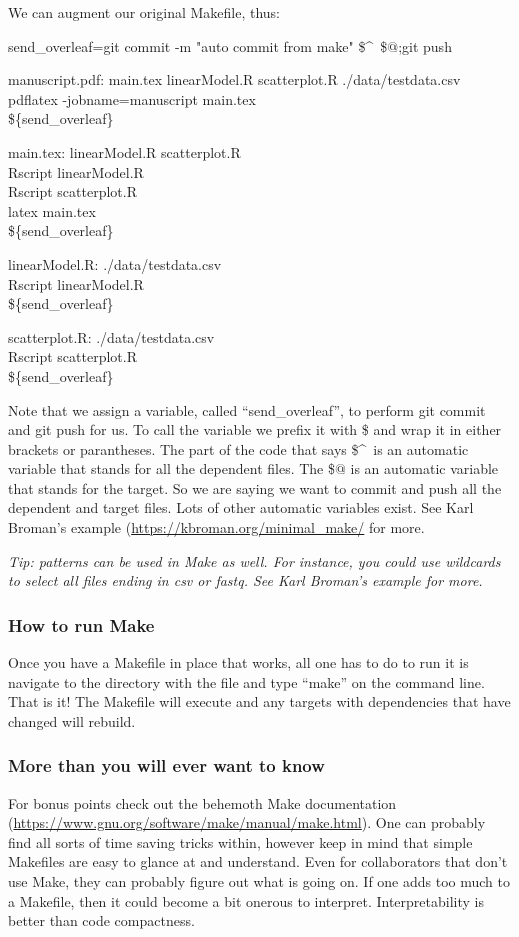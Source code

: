 \documentclass{article}
\begin{document}
We can augment our original Makefile, thus:

send\_overleaf=git commit -m "auto commit from make" \$\textasciicircum\ \$$@$;git push

manuscript.pdf: main.tex linearModel.R scatterplot.R ./data/testdata.csv\\
\tab pdflatex -jobname=manuscript main.tex\\
\tab \$\{send\_overleaf\}

main.tex: linearModel.R scatterplot.R\\
\tab Rscript linearModel.R\\
\tab Rscript scatterplot.R\\
\tab latex main.tex\\
\tab \$\{send\_overleaf\}

linearModel.R: ./data/testdata.csv\\
\tab Rscript linearModel.R\\
\tab \$\{send\_overleaf\}

scatterplot.R: ./data/testdata.csv\\
\tab Rscript scatterplot.R\\
\tab \$\{send\_overleaf\}

Note that we assign a variable, called ``send\_overleaf'', to perform git commit and git push for us. To call the variable we prefix it with \$ and wrap it in either brackets or parantheses. The part of the code that says \$\textasciicircum\ is an automatic variable that stands for all the dependent files. The \$$@$ is an automatic variable that stands for the target. So we are saying we want to commit and push all the dependent and target files. Lots of other automatic variables exist. See Karl Broman's example (\url{https://kbroman.org/minimal_make/} for more.

\emph{Tip: patterns can be used in {\sf Make} as well. For instance, you could use wildcards to select all files ending in csv or fastq. See Karl Broman's example for more.}

\subsubsection{How to run {\sf Make}}

Once you have a Makefile in place that works, all one has to do to run it is navigate to the directory with the file and type ``make'' on the command line. That is it! The Makefile will execute and any targets with dependencies that have changed will rebuild. 

\subsubsection{More than you will ever want to know}

For bonus points check out the behemoth {\sf Make} documentation (\url{https://www.gnu.org/software/make/manual/make.html}). One can probably find all sorts of time saving tricks within, however keep in mind that simple Makefiles are easy to glance at and understand. Even for collaborators that don't use {\sf Make}, they can probably figure out what is going on. If one adds too much to a Makefile, then it could become a bit onerous to interpret. Interpretability is better than code compactness.
\end{document}
